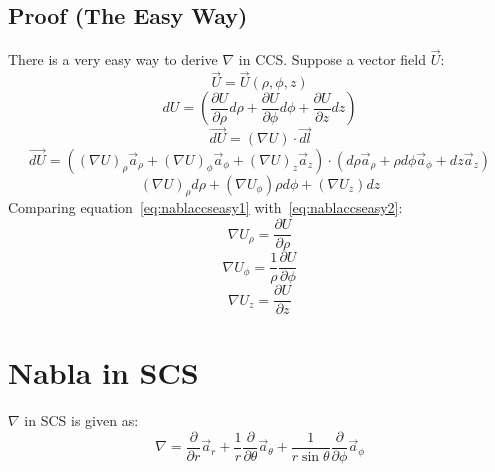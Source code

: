             \subsection{Proof (The Easy Way)}
                There is a very easy way to derive $\nabla$ in CCS. 
                Suppose a vector field $\vec{U}$:
                $$\vec{U} = \vec{U}(\rho, \phi, z)$$
                \begin{equation}\label{eq:nablaccseasy1}
                    dU = \left(\frac{\partial U}{\partial \rho}d\rho + \frac{\partial U}{\partial\phi}d\phi + \frac{\partial U}{\partial z}dz\right)
                \end{equation}
                $$\vec{dU} = \left(\nabla U\right)\cdot\vec{dl}$$
                $$\vec{dU} = \left((\nabla U)_\rho\vec{a}_\rho + (\nabla U)_\phi\vec{a}_\phi + (\nabla U)_z\vec{a}_z\right)\cdot\left(d\rho\vec{a}_\rho + \rho d\phi\vec{a}_\phi + dz\vec{a}_z\right)$$
                \begin{equation}\label{eq:nablaccseasy2}
                    (\nabla U)_\rho d\rho + (\nabla U_\phi)\rho d\phi + (\nabla U_z)dz
                \end{equation}
                Comparing equation~\ref{eq:nablaccseasy1} with~\ref{eq:nablaccseasy2}:
                $$\nabla U_\rho = \frac{\partial U}{\partial\rho}$$
                $$\nabla U_\phi = \frac{1}{\rho}\frac{\partial U}{\partial \phi}$$
                $$\nabla U_z = \frac{\partial U}{\partial z}$$
        \section{Nabla in SCS}
            $\nabla$ in SCS is given as:
            $$\nabla = \frac{\partial}{\partial r}\vec{a}_r + \frac{1}{r}\frac{\partial}{\partial \theta}\vec{a}_\theta + \frac{1}{r\sin\theta}\frac{\partial}{\partial \phi}\vec{a}_\phi$$
